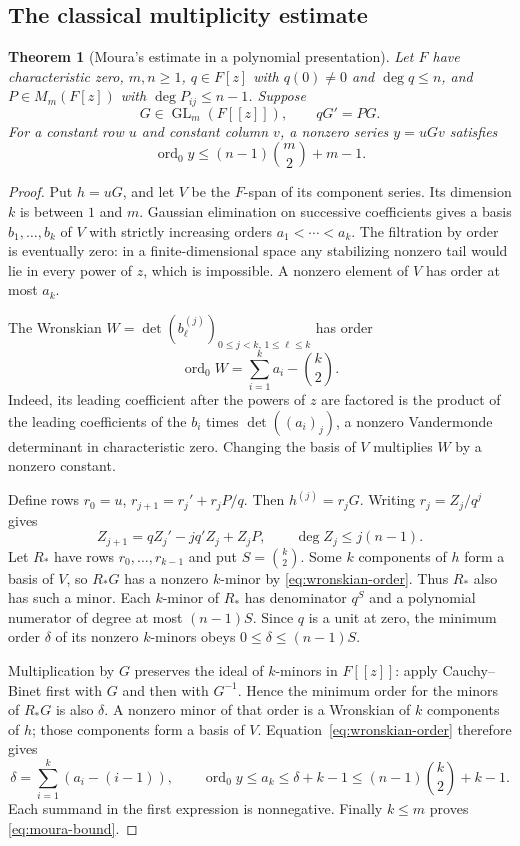 \documentclass[11pt]{article}
\numberwithin{equation}{section}
\newtheorem{theorem}{Theorem}[section]
\theoremstyle{definition}\newtheorem{definition}[theorem]{Definition}
\theoremstyle{remark}\newtheorem{remark}[theorem]{Remark}
\newcommand{\ord}{\operatorname{ord}}
\newcommand{\GL}{\operatorname{GL}}
\begin{document}
\subsection{The classical multiplicity estimate}
\begin{theorem}[Moura's estimate in a polynomial presentation]
\label{thm:multiplicity}
Let $F$ have characteristic zero, $m,n\ge1$, $q\in F[z]$ with
$q(0)\ne0$ and $\deg q\le n$, and $P\in M_m(F[z])$ with
$\deg P_{ij}\le n-1$. Suppose
\[
 G\in\GL_m(F[[z]]),\qquad qG'=PG.
\]
For a constant row $u$ and constant column $v$, a nonzero series
$y=uGv$ satisfies
\begin{equation}\label{eq:moura-bound}
 \ord_0 y\le(n-1)\binom m2+m-1.
\end{equation}
\end{theorem}
\begin{proof}
Put $h=uG$, and let $V$ be the $F$-span of its component series.
Its dimension $k$ is between $1$ and $m$. Gaussian elimination on
successive coefficients gives a basis $b_1,\ldots,b_k$ of $V$ with
strictly increasing orders $a_1<\cdots<a_k$. The filtration by order
is eventually zero: in a finite-dimensional space any stabilizing
nonzero tail would lie in every power of $z$, which is impossible.
A nonzero element of $V$ has order at most $a_k$.

The Wronskian $W=\det(b_\ell^{(j)})_{0\le j<k,\,1\le\ell\le k}$
has order
\begin{equation}\label{eq:wronskian-order}
 \ord_0W=\sum_{i=1}^k a_i-\binom k2.
\end{equation}
Indeed, its leading coefficient after the powers of $z$ are factored
is the product of the leading coefficients of the $b_i$ times
$\det((a_i)_j)$, a nonzero Vandermonde determinant in characteristic
zero. Changing the basis of $V$ multiplies $W$ by a nonzero constant.

Define rows $r_0=u$, $r_{j+1}=r_j'+r_jP/q$. Then
$h^{(j)}=r_jG$. Writing $r_j=Z_j/q^j$ gives
\[
 Z_{j+1}=qZ_j'-j q'Z_j+Z_jP,\qquad \deg Z_j\le j(n-1).
\]
Let $R_*$ have rows $r_0,\ldots,r_{k-1}$ and put $S=\binom k2$.
Some $k$ components of $h$ form a basis of $V$, so $R_*G$ has a
nonzero $k$-minor by \eqref{eq:wronskian-order}. Thus $R_*$ also has
such a minor. Each $k$-minor of $R_*$ has denominator $q^S$ and a
polynomial numerator of degree at most $(n-1)S$. Since $q$ is a unit
at zero, the minimum order $\delta$ of its nonzero $k$-minors obeys
$0\le\delta\le(n-1)S$.

Multiplication by $G$ preserves the ideal of $k$-minors in $F[[z]]$:
apply Cauchy--Binet first with $G$ and then with $G^{-1}$. Hence the
minimum order for the minors of $R_*G$ is also $\delta$. A nonzero
minor of that order is a Wronskian of $k$ components of $h$; those
components form a basis of $V$. Equation~\eqref{eq:wronskian-order}
therefore gives
\[
 \delta=\sum_{i=1}^k(a_i-(i-1)),\qquad
 \ord_0y\le a_k\le\delta+k-1
     \le(n-1)\binom k2+k-1.
\]
Each summand in the first expression is nonnegative. Finally $k\le m$
proves \eqref{eq:moura-bound}.
\end{proof}
\end{document}
